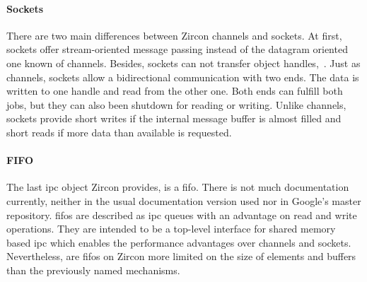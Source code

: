 %
%
%
%
%

\paragraph{Sockets}
There are two main differences between Zircon channels and sockets.
At first, sockets offer stream-oriented message passing instead of the datagram oriented one known of channels.
Besides, sockets can not transfer object handles\cite{zircon-concepts},~\cite{zircon-socket}.
Just as channels, sockets allow a bidirectional communication with two ends.
The data is written to one handle and read from the other one. 
Both ends can fulfill both jobs, but they can also been shutdown for reading or writing\cite{zircon-socket}.
Unlike channels, sockets provide short writes if the internal message buffer is almost filled and short reads if more data than available is requested\cite{zircon-concepts}.

%
%
%

\paragraph{FIFO}
The last \ac{ipc} object Zircon provides, is a \ac{fifo}.
There is not much documentation currently, neither in the usual documentation version used nor in Google's master repository.
\acp{fifo} are described as \ac{ipc} queues with an advantage on read and write operations.
They are intended to be a top-level interface for shared memory based \ac{ipc} which enables the performance advantages over channels and sockets.
Nevertheless, are \acp{fifo} on Zircon more limited on the size of elements and buffers than the previously named mechanisms\cite{zircon-fifo}.

